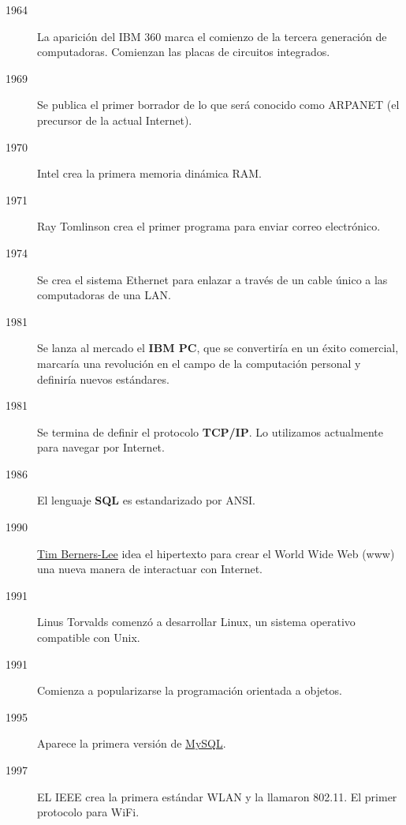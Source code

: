 \begin{description}
    \item[1964] La aparición del IBM 360 marca el comienzo de la tercera generación de computadoras. Comienzan las placas de circuitos integrados.

    \item[1969] Se publica el primer borrador de lo que será conocido como ARPANET (el precursor de la actual Internet).

    \item[1970] Intel crea la primera memoria dinámica RAM.

    \item[1971] Ray Tomlinson crea el primer programa para enviar correo electrónico.

    \item[1974] Se crea el sistema Ethernet para enlazar a través de un cable único a las computadoras de una LAN.

    \item[1981] Se lanza al mercado el \textbf{IBM PC}, que se convertiría en un éxito comercial, marcaría una revolución en el campo de la computación personal y definiría nuevos estándares.

    \item[1981] Se termina de definir el protocolo \textbf{TCP/IP}. Lo utilizamos actualmente para navegar por Internet.

    \item[1986] El lenguaje \textbf{SQL} es estandarizado por ANSI.

    \item[1990] \href{https://es.wikipedia.org/wiki/Tim_Berners-Lee}{Tim Berners-Lee} idea el hipertexto para crear el World Wide Web (www) una nueva manera de interactuar con Internet.

    \item[1991] Linus Torvalds comenzó a desarrollar Linux, un sistema operativo compatible con Unix.

    \item[1991] Comienza a popularizarse la programación orientada a objetos.

    \item[1995] Aparece la primera versión de \href{https://es.wikipedia.org/wiki/MySQL}{MySQL}.

    \item[1997] EL IEEE crea la primera estándar WLAN y la llamaron 802.11. El primer protocolo para WiFi.

\end{description}